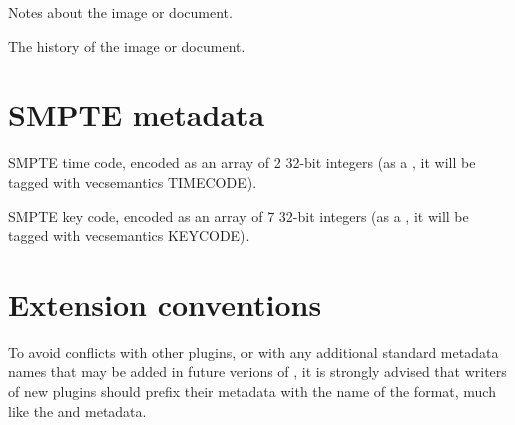 Notes about the image or document.
\apiend

The history of the image or document.
\apiend


\section{SMPTE metadata}
\label{sec:metadata:smpte}

SMPTE time code, encoded as an array of 2 32-bit integers (as a
\TypeDesc, it will be tagged with vecsemantics {\cf TIMECODE}).
\apiend

SMPTE key code, encoded as an array of 7 32-bit integers (as a
\TypeDesc, it will be tagged with vecsemantics {\cf KEYCODE}).
\apiend




\section{Extension conventions}

To avoid conflicts with other plugins, or with any additional standard
metadata names that may be added in future verions of \product, it is
strongly advised that writers of new plugins should prefix their
metadata with the name of the format, much like the 
and  metadata.


\chapwidthend
